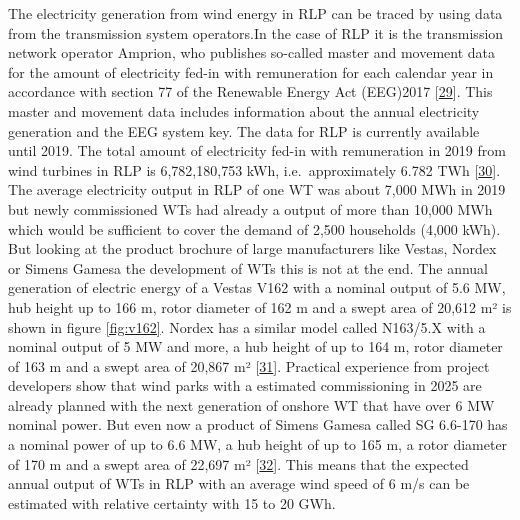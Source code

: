 \documentclass[a4paper,11pt]{article}
\begin{document}
The electricity generation from wind energy in RLP can be traced by using data from the transmission system operators.In the case of RLP it is the transmission network operator Amprion, who publishes so-called master and movement data for the amount of electricity fed-in with remuneration for each calendar year in accordance with section 77 of the Renewable Energy Act (EEG)2017 {[}\protect\hyperlink{ref-Bundesgestzblatt.2017}{29}{]}. This master and movement data includes information about the annual electricity generation and the EEG system key. The data for RLP is currently available until 2019. The total amount of electricity fed-in with remuneration in 2019 from wind turbines in RLP is 6,782,180,753 kWh, i.e.~approximately 6.782 TWh {[}\protect\hyperlink{ref-EnergieagenturRheinlandPfalz.2019}{30}{]}. The average electricity output in RLP of one WT was about 7,000 MWh in 2019 but newly commissioned WTs had already a output of more than 10,000 MWh which would be sufficient to cover the demand of 2,500 households (4,000 kWh). But looking at the product brochure of large manufacturers like Vestas, Nordex or Simens Gamesa the development of WTs this is not at the end. The annual generation of electric energy of a Vestas V162 with a nominal output of 5.6 MW, hub height up to 166 m, rotor diameter of 162 m and a swept area of 20,612 m² is shown in figure \ref{fig:v162}. Nordex has a similar model called N163/5.X with a nominal output of 5 MW and more, a hub height of up to 164 m, rotor diameter of 163 m and a swept area of 20,867 m² {[}\protect\hyperlink{ref-Nordex.2021}{31}{]}. Practical experience from project developers show that wind parks with a estimated commissioning in 2025 are already planned with the next generation of onshore WT that have over 6 MW nominal power. But even now a product of Simens Gamesa called SG 6.6-170 has a nominal power of up to 6.6 MW, a hub height of up to 165 m, a rotor diameter of 170 m and a swept area of 22,697 m² {[}\protect\hyperlink{ref-SimensGamesa.2021}{32}{]}. This means that the expected annual output of WTs in RLP with an average wind speed of 6 m/s can be estimated with relative certainty with 15 to 20 GWh.
\end{document}
